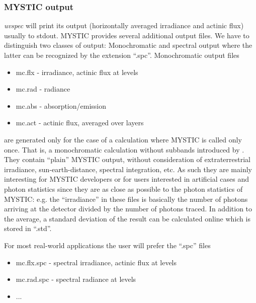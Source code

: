 \subsubsection{MYSTIC output}

{\sl uvspec} will print its output (horizontally averaged 
irradiance and actinic flux) usually to stdout. MYSTIC provides 
several additional output 
files. We have to distinguish two classes of output: 
Monochromatic and spectral output where the latter can be recognized 
by the extension ``.spc''. Monochromatic output files

\begin{itemize}
\item mc.flx - irradiance, actinic flux at levels
\item mc.rad - radiance 
\item mc.abs - absorption/emission
\item mc.act - actinic flux, averaged over layers
\end{itemize}  

are generated only for the case of a calculation where MYSTIC is called 
only once. That is, a monochromatic calculation without subbands introduced 
by . They contain ``plain'' MYSTIC output, without
consideration of extraterrestrial irradiance, sun-earth-distance, spectral
integration, etc. As such they are mainly interesting for MYSTIC developers
or for users interested in artificial cases and photon statistics since 
they are as close as possible to the photon statistics of MYSTIC: e.g. 
the ``irradiance'' in these files is basically the number of photons arriving
at the detector divided by the number of photons traced. In addition to the 
average, a standard deviation of the result can be calculated online which is 
stored in ``.std''. 

For most real-world applications the user will prefer the ``.spc'' files

\begin{itemize}
 \item mc.flx.spc - spectral irradiance, actinic flux at levels
 \item mc.rad.spc - spectral radiance at levels
 \item ...
\end{itemize}

